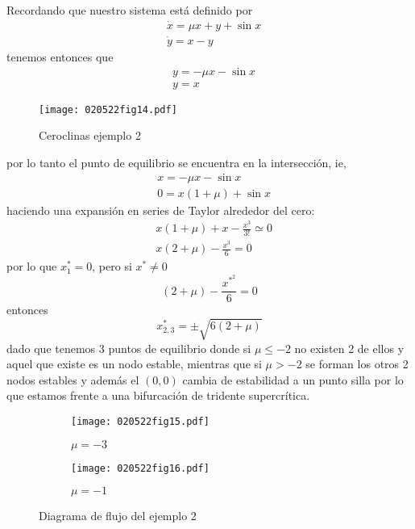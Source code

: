 \begin{ejemplo}
 Recordando que nuestro sistema está definido por
\begin{equation*}
\begin{aligned}
&\dot{x}=\mu x+y+\sin x \\
&\dot{y}=x-y
\end{aligned}
\end{equation*}
tenemos entonces que 
\begin{align*}
	&y=-\mu x - \sin x \\
	&y=x
\end{align*}
\begin{figure}[H]
	\centering
	\texttt{[image: 020522fig14.pdf]}
	\caption{Ceroclinas ejemplo 2}
\end{figure}
por lo tanto el punto de equilibrio se encuentra en la intersección, ie,
\begin{align*}
  &x=-\mu x - \sin x \\
  &0=x(1+\mu)+\sin x  
\end{align*}
haciendo una expansión en series de Taylor alrededor del cero:
\begin{align*}
  &x(1+\mu)+x - \frac{x^3}{3!} \simeq 0 \\
  &x(2+\mu)-\frac{x^3}{6} = 0  
\end{align*}
por lo que $x_1^*=0$, pero si $x^*\neq 0$
\begin{equation*}
	(2+\mu) - \frac{ x^{{*}^2}}{6} = 0 
\end{equation*}
entonces
\begin{equation*}
  x^*_{2,3} = \pm \sqrt{6(2+\mu)} 
\end{equation*}
dado que tenemos 3 puntos de equilibrio donde si $ \mu \le -2$ no existen 2 de ellos y aquel que existe es un nodo estable, mientras que si $ \mu>-2$ se forman los otros 2 nodos estables y además el $(0,0)$ cambia de estabilidad a un punto silla por lo que estamos frente a una bifurcación de tridente supercrítica.
\begin{figure}[H]
  \begin{subfigure}[b]{0.49\textwidth}
		\texttt{[image: 020522fig15.pdf]}
    \caption{$\mu=-3$}
  \end{subfigure}
  \hfill
  \begin{subfigure}[b]{0.49\textwidth}
    \texttt{[image: 020522fig16.pdf]}
    \caption{$\mu=-1$}
  \end{subfigure}
  \caption{Diagrama de flujo del ejemplo 2}
\end{figure}
\end{ejemplo}
